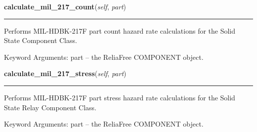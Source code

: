     \label{reliafree:relays:relay:SolidState:calculate_mil_217_count}

    \vspace{0.5ex}

\hspace{.8\funcindent}\begin{boxedminipage}{\funcwidth}

    \raggedright \textbf{calculate\_mil\_217\_count}(\textit{self}, \textit{part})

    \vspace{-1.5ex}

    \rule{\textwidth}{0.5\fboxrule}
\setlength{\parskip}{2ex}
    Performs MIL-HDBK-217F part count hazard rate calculations for the 
    Solid State Component Class.

    Keyword Arguments: part -- the ReliaFree COMPONENT object.

\setlength{\parskip}{1ex}
    \end{boxedminipage}

    \label{reliafree:relays:relay:SolidState:calculate_mil_217_stress}

    \vspace{0.5ex}

\hspace{.8\funcindent}\begin{boxedminipage}{\funcwidth}

    \raggedright \textbf{calculate\_mil\_217\_stress}(\textit{self}, \textit{part})

    \vspace{-1.5ex}

    \rule{\textwidth}{0.5\fboxrule}
\setlength{\parskip}{2ex}
    Performs MIL-HDBK-217F part stress hazard rate calculations for the 
    Solid State Relay Component Class.

    Keyword Arguments: part -- the ReliaFree COMPONENT object.

\setlength{\parskip}{1ex}
    \end{boxedminipage}

